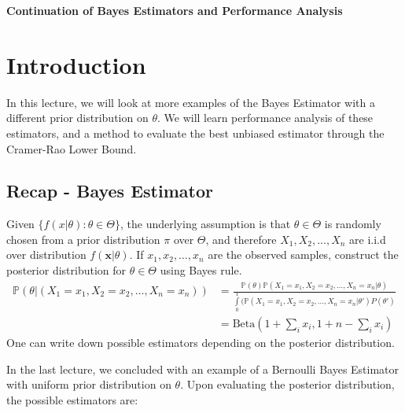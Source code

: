 \documentclass[12pt]{report}
\begin{document}
\maketitle


\begin{center}
{\Large \bf Continuation of Bayes Estimators and Performance Analysis}
\end{center}

\section{Introduction}

In this lecture, we will look at more examples of the Bayes Estimator with a different prior distribution on $\theta$. We will learn performance analysis of these estimators, and a method to evaluate the best unbiased estimator through the Cramer-Rao Lower Bound.

\subsection{Recap - Bayes Estimator}
\par Given $\{f(x|\theta):\theta \in \Theta\}$, the underlying assumption is that $\theta \in \Theta$ is randomly chosen from a prior distribution $\pi$ over $\Theta$, and therefore $X_1,X_2,...,X_n$ are i.i.d over distribution $f(\textbf{x}|\theta)$. If $x_1,x_2,\dots,x_n$ are the observed samples, construct the posterior distribution for $\theta \in \Theta$ using Bayes rule.
\begin{align}
\mathbb{P}(\theta|(X_1=x_1,X_2=x_2,\dots,X_n=x_n))
&=\frac{\mathbb{P}(\theta)\mathbb{P}(X_1=x_1,X_2=x_2,\dots,X_n=x_n|\theta)}{\int\limits_0^1 (\mathbb{P}(X_1=x_1,X_2=x_2,\dots,X_n=x_n\vert\theta')P(\theta')} \nonumber\\
&=\displaystyle{\mathrm{Beta}\left(1+\sum\limits_i {x_i},1+n-\sum\limits_i x_i\right)}
\end{align}
One can write down possible estimators depending on the posterior distribution.

In the last lecture, we concluded with an example of a Bernoulli Bayes Estimator with uniform prior distribution on $\theta$. Upon evaluating the posterior distribution, the possible estimators are:\\
\end{document}
